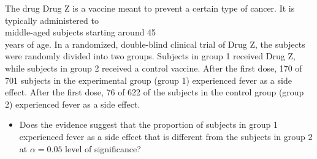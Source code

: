 \documentclass[11pt]{book}\usepackage[]{graphicx}\usepackage[]{color}
\begin{document}
\begin{exercises}
%   
\begin{exercise}   %

The drug Drug Z is a vaccine meant to prevent a certain type of cancer.  It is typically administered to \\ middle-aged subjects starting around 45 \\ years of age.  In a randomized, double-blind clinical trial of Drug Z,  the subjects were randomly divided into two groups.  Subjects in group 1 received Drug Z, while subjects in group 2 received a control vaccine.  After the first  dose, 170 of 701 subjects in the experimental group (group 1) experienced fever as a side effect.  After the first dose, 76 of 622 of the subjects in the control group (group 2) experienced fever as a side effect.

\begin{itemize}
\item Does the evidence suggest that the proportion of subjects in group 1  experienced fever as a side effect that is different from the subjects in group 2 at $\alpha = 0.05$ level of significance?
 \end{itemize}
	  \vspace{5mm}


\end{exercise}
\end{exercises}
\end{document}
